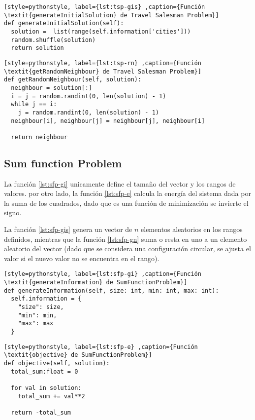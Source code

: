 \begin{lstlisting}[style=pythonstyle, label={lst:tsp-gis} ,caption={Función \textit{generateInitialSolution} de Travel Salesman Problem}]
def generateInitialSolution(self):
  solution =  list(range(self.information['cities']))
  random.shuffle(solution)
  return solution   
\end{lstlisting}

\begin{lstlisting}[style=pythonstyle, label={lst:tsp-rn} ,caption={Función \textit{getRandomNeighbour} de Travel Salesman Problem}]
def getRandomNeighbour(self, solution):
  neighbour = solution[:]
  i = j = random.randint(0, len(solution) - 1)
  while j == i:
    j = random.randint(0, len(solution) - 1)
  neighbour[i], neighbour[j] = neighbour[j], neighbour[i]

  return neighbour
\end{lstlisting}

\subsection{Sum function Problem}

La función \ref{lst:sfp-gi} unicamente define el tamaño del vector y los rangos de valores. por otro lado, la función \ref{lst:sfp-e} calcula la energía del sistema dada por la suma de los cuadrados, dado que es una función de minimización se invierte el signo.

La función \ref{lst:sfp-gis} genera un vector de $n$ elementos aleatorios en los rangos definidos, mientras que la función \ref{lst:sfp-gn} suma  o resta en uno a un elemento aleatorio del vector (dado que se considera una configuración circular, se ajusta el valor si el nuevo valor no se encuentra en el rango).

\begin{lstlisting}[style=pythonstyle, label={lst:sfp-gi} ,caption={Función \textit{generateInformation} de SumFunctionProblem}]
def generateInformation(self, size: int, min: int, max: int):
  self.information = {
	"size": size,
	"min": min,
	"max": max
  }
\end{lstlisting}

\begin{lstlisting}[style=pythonstyle, label={lst:sfp-e} ,caption={Función \textit{objective} de SumFunctionProblem}]
def objective(self, solution):
  total_sum:float = 0

  for val in solution:
    total_sum += val**2

  return -total_sum
\end{lstlisting}

